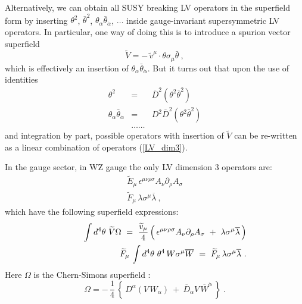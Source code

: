 \documentclass[12pt]{revtex4}
\begin{document}
Alternatively, we can obtain 
all SUSY breaking LV operators in the superfield form by
inserting  $ \theta^2 $, 
$ \bar{\theta}^2 $, 
$ \theta_\alpha \bar{\theta}_{\dot\alpha} $, 
$ \dots $ inside
gauge-invariant supersymmetric LV operators.
In particular, one way of doing this 
\cite{GrootNibbelink:2004za}
is to introduce a spurion vector superfield
\[
\widetilde{V} = -\, \widetilde{v}^\mu \cdot 
\theta \sigma_\mu \bar{\theta}~,
\]
which is effectively an insertion of 
$ \theta_\alpha \bar{\theta}_{\dot\alpha} $.
But it turns out that upon the use of identities
\begin{eqnarray*}
\theta^2 & = & \overline{D}^2 ( \theta^2 \bar{\theta}^2 ) \\
\theta_\alpha \bar{\theta}_{\dot\alpha} & = &
D^2 \overline{D}^2 ( \theta^2 \bar{\theta}^2 ) \\
         & \ldots\ldots &
\end{eqnarray*}
and integration by part, possible operators with insertion of $\widetilde V$ can 
be re-written as a linear combination 
 of operators (\ref{LV_dim3}).

In the gauge sector, in WZ gauge the only LV dimension 3 
operators are:
\begin{eqnarray}
\nonumber
& 
\widetilde{E}_\mu\, \epsilon^{\mu\nu\rho\sigma}
A_\nu \partial_\rho A_\sigma  &\\
\nonumber
&
\widetilde{F}_\mu\, \lambda \sigma^\mu \overline{\lambda} 
~, &
\end{eqnarray}
which have the following superfield expressions:
\begin{eqnarray*}
\label{CSint}
&&
\phantom{\widetilde{F}_\mu\,}
\int d^4\theta~ \widetilde{V} \Omega 
~ = ~
   \frac{\widetilde{v}_\mu}{4}\,
\Bigl(\, 
\epsilon^{\mu\nu\rho\sigma}
A_\nu \partial_\rho A_\sigma
~+~
\lambda \sigma^\mu \overline{\lambda}
        \,
\Bigr) \\
&&
\widetilde{F}_\mu\, \int d^4\theta~ \theta^4\, 
W \sigma^\mu \overline{W} 
~ = ~
\widetilde{F}_\mu\, \lambda \sigma^\mu \overline{\lambda}~.
\end{eqnarray*}
Here $ \Omega $ is the Chern-Simons superfield
\cite{Cecotti:1987nw}:
\[
\Omega = -\, \frac{1}{4}\,
\left\{\, 
D^\alpha (V\, W_\alpha) 
~+~
\overline{D}_{\dot\alpha}V\,
\overline{W}^{\dot\alpha}
\,
\right\}~.
\]
\end{document}
